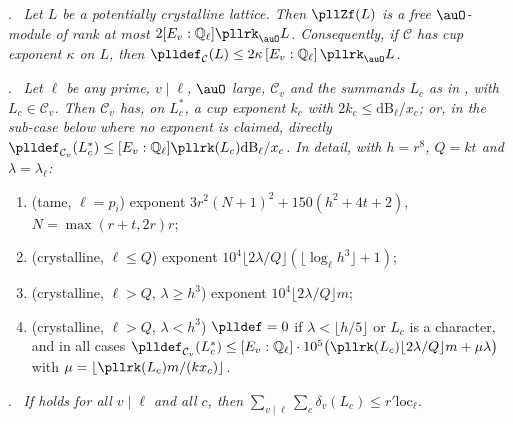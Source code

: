 \documentclass[10pt]{amsart}
\theoremstyle{definition}
\theoremstyle{remark}
\newcommand{\Q}{\mathbb Q}
\providecommand{\pgloc}{\mathrm{loc}}
\providecommand{\pllD}{\mathrm{dB}}
\newenvironment{quotedthm}[2]{\par\medskip\noindent\begingroup
  \textbf{#1}#2.\ \itshape\ignorespaces}{\endgroup\par\medskip}
\begin{document}
\begin{quotedthm}{\cite[Lemma~5.6]{P55}}{}
Let $L$ be a potentially crystalline lattice. Then $\pllZf(L)$ is a free $\auO$-module of rank at
most $2[E_v:\Q_\ell]\pllrk_\auO L$. Consequently, if $\mathcal C$ has cup exponent $\kappa$ on $L$, then
$\plldef_{\mathcal C}(L)\le2\kappa\,[E_v:\Q_\ell]\,\pllrk_\auO L$.
\end{quotedthm}

\begin{quotedthm}{\cite[Theorem~5.8]{P55}}{}
Let $\ell$ be any prime, $v\mid\ell$, $\auO$ large, $\mathcal C_v$ and the summands $L_c$ as in
{\cite[Proposition~5.2]{P55}}, with $L_c\in\mathcal C_v$. Then $\mathcal C_v$ has, on $L_c^*$, a cup
exponent $k_c$ with $2k_c\le\pllD_\ell/x_c$; or, in the sub-case below where no exponent is
claimed, directly $\plldef_{\mathcal C_v}(L_c^*)\le[E_v:\Q_\ell]\pllrk(L_c)\pllD_\ell/x_c$. In
detail, with $h=r^8$, $Q=kt$ and $\lambda=\lambda_\ell$:
\begin{enumerate}
\item[(a)] (tame, $\ell=p_i$) exponent $3r^2(N+1)^2+150(h^2+4t+2)$, $N=\max(r+t,2r)r$;
\item[(b)] (crystalline, $\ell\le Q$) exponent $10^4\lfloor2\lambda/Q\rfloor(\lfloor\log_\ell
h^3\rfloor+1)$;
\item[(c)] (crystalline, $\ell>Q$, $\lambda\ge h^3$) exponent $10^4\lfloor2\lambda/Q\rfloor m$;
\item[(d)] (crystalline, $\ell>Q$, $\lambda<h^3$) $\plldef=0$ if $\lambda<\lfloor h/5\rfloor$ or
$L_c$ is a character, and in all cases $\plldef_{\mathcal C_v}(L_c^*)\le
[E_v:\Q_\ell]\cdot10^5\bigl(\pllrk(L_c)\lfloor2\lambda/Q\rfloor m+\mu\lambda\bigr)$ with
$\mu=\lfloor\pllrk(L_c)m/(kx_c)\rfloor$.
\end{enumerate}
\end{quotedthm}

\begin{quotedthm}{\cite[Lemma~5.10]{P55}}{}
If {\cite[(9)]{P55}} holds for all $v\mid\ell$ and all $c$, then $\sum_{v\mid\ell}\sum_c
\delta_v(L_c)\le r'\pgloc_\ell$.
\end{quotedthm}
\end{document}

